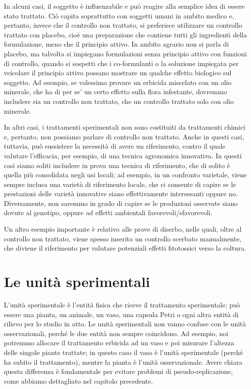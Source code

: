 \documentclass[a4paper,12pt,oneside]{book}
\begin{document}
In alcuni casi, il soggetto è influenzabile e può reagire alla semplice idea di essere stato trattato. Ciò capita soprattutto con soggetti umani in ambito medico e, pertanto, invece che il controllo non trattato, si preferisce utilizzare un controllo trattato con placebo, cioè una preparazione che contiene tutti gli ingredienti della formulazione, meno che il principio attivo. In ambito agrario non si parla di placebo, ma talvolta si impiegano formulazioni senza principio attivo con funzioni di controllo, quando si sospetti che i co-formulanti o la soluzione impiegata per veicolare il principio attivo possano mostrare un qualche effetto biologico sul soggetto. Ad esempio, se volessimo provare un erbicida miscelato con un olio minerale, che ha di per se' un certo effetto sulla flora infestante, dovremmo includere sia un controllo non trattato, che un controllo trattato solo con olio minerale.

In altri casi, i trattamenti sperimentali non sono costituiti da trattamenti chimici e, pertanto, non possiamo parlare di controllo non trattato. Anche in questi casi, tuttavia, può sussistere la necessità di avere un riferimento, contro il quale valutare l'efficacia, per esempio, di una tecnica agronomica innovativa. In questi casi siamo soliti includere in prova una tecnica di riferimento, che di solito è quella più consolidata negli usi locali; ad esempio, in un confronto varietale, viene sempre inclusa una varietà di riferimento locale, che ci consente di capire se le prestazioni delle varietà innovative siano effettivamente interessanti oppure no. Diversamente, non saremmo in grado di capire se le produzioni osservate siano dovute al genotipo, oppure ad effetti ambientali favorevoli/sfavorevoli.

Un altro esempio importante è relativo alle prove di diserbo, nelle quali, oltre al controllo non trattato, viene spesso inserito un controllo scerbato manualmente, che diviene il riferimento per valutare potenziali effetti fitotossici verso la coltura.

\hypertarget{le-unituxe0-sperimentali}{%
\section{Le unità sperimentali}\label{le-unituxe0-sperimentali}}

L'unità sperimentale è l'entità fisica che riceve il trattamento sperimentale; può essere una pianta, un animale, un vaso, una capsula Petri o ogni altra entità di rilievo per lo studio in atto. Le unità sperimentali non vanno confuse con le unità osservazionali, perché le due entità non sempre coincidono. Ad esempio, noi potremmo allocare il trattamento erbicida ad un vaso e poi misurare l'altezza delle singole piante trattate; in questo caso il vaso è l'unità sperimentale (perché ha subito il trattamento), mentre la pianta è l'unità osservazionale. Avere chiara questa differenza è fondamentale per evitare problemi di pseudo-replicazione, come abbiamo dettagliato nel capitolo precedente.
\end{document}
